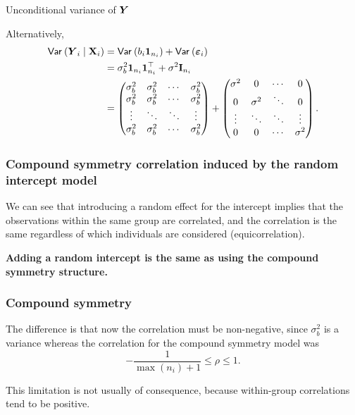 \documentclass{beamer}
\begin{document}
\begin{frame}{Unconditional variance of $\boldsymbol {Y}$}


Alternatively,
\begin{align*}
   {\mathsf{Var}_{}}\left(\boldsymbol {Y}_i \mid \mathbf{X}_i\right) &= {\mathsf{Var}_{}}\left(b_i \boldsymbol {1}_{n_i}\right) + {\mathsf{Var}_{}}\left(\boldsymbol {\varepsilon}_i\right)
   \\&= \sigma^2_b \boldsymbol {1}_{n_i}\boldsymbol {1}_{n_i}^\top + \sigma^2 \mathbf{I}_{n_i}
   \\&= 
   \begin{pmatrix}
 \sigma^2_b &  \sigma^2_b & \cdots & \sigma^2_b \\
  \sigma^2_b &  \sigma^2_b & \cdots & \sigma^2_b \\
 \vdots & \ddots & \ddots & \vdots \\
 \sigma^2_b &  \sigma^2_b & \cdots & \sigma^2_b   
 \end{pmatrix} + \begin{pmatrix}
 \sigma^2 & 0 & \cdots &0\\
 0 & \sigma^2 & \ddots &0\\
 \vdots &\ddots & \ddots & \vdots\\
 0 & 0 & \cdots & \sigma^2
 \end{pmatrix}.
\end{align*}

\end{frame}


\begin{frame}[fragile]
\frametitle{Compound symmetry correlation induced by the random intercept model}
\bi
\item We can see that introducing a random effect for the intercept implies that the observations within the same group are correlated, and the correlation is the same regardless of which individuals are considered (equicorrelation).
\item \textbf{Adding a random intercept is the same as using the compound symmetry structure.}
\ei
\end{frame}
\begin{frame}
\frametitle{Compound symmetry}
\bi
\item The difference is that now the correlation must be non-negative, since $\sigma^2_b$ is a variance whereas the correlation for the compound symmetry model was \[-\frac{1}{\max(n_i)+1} \leq \rho \leq 1.\]
\item This limitation is not usually of consequence, because within-group correlations tend to be positive.

\ei
\end{frame}
\end{document}

